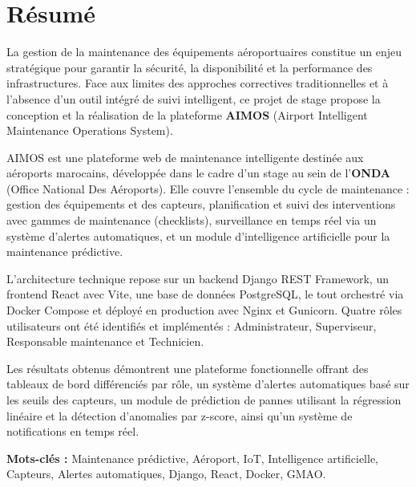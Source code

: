 \chapter*{Résumé}

La gestion de la maintenance des équipements aéroportuaires constitue un enjeu stratégique pour garantir la sécurité, la disponibilité et la performance des infrastructures. Face aux limites des approches correctives traditionnelles et à l'absence d'un outil intégré de suivi intelligent, ce projet de stage propose la conception et la réalisation de la plateforme \textbf{AIMOS} (Airport Intelligent Maintenance Operations System).

AIMOS est une plateforme web de maintenance intelligente destinée aux aéroports marocains, développée dans le cadre d'un stage au sein de l'\textbf{ONDA} (Office National Des Aéroports). Elle couvre l'ensemble du cycle de maintenance : gestion des équipements et des capteurs, planification et suivi des interventions avec gammes de maintenance (checklists), surveillance en temps réel via un système d'alertes automatiques, et un module d'intelligence artificielle pour la maintenance prédictive.

L'architecture technique repose sur un backend Django REST Framework, un frontend React avec Vite, une base de données PostgreSQL, le tout orchestré via Docker Compose et déployé en production avec Nginx et Gunicorn. Quatre rôles utilisateurs ont été identifiés et implémentés : Administrateur, Superviseur, Responsable maintenance et Technicien.

Les résultats obtenus démontrent une plateforme fonctionnelle offrant des tableaux de bord différenciés par rôle, un système d'alertes automatiques basé sur les seuils des capteurs, un module de prédiction de pannes utilisant la régression linéaire et la détection d'anomalies par z-score, ainsi qu'un système de notifications en temps réel.

\vspace{0.5cm}
\noindent\textbf{Mots-clés :} Maintenance prédictive, Aéroport, IoT, Intelligence artificielle, Capteurs, Alertes automatiques, Django, React, Docker, GMAO.
